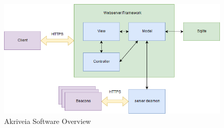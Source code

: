 \bigskip
\begin{figure}[h!]
    \centering
    \includegraphics[width=\linewidth]{./images/softwarediagram.png}
    \caption{Akriveia Software Overview}
    \label{software_diagram}
\end{figure}
\bigskip
